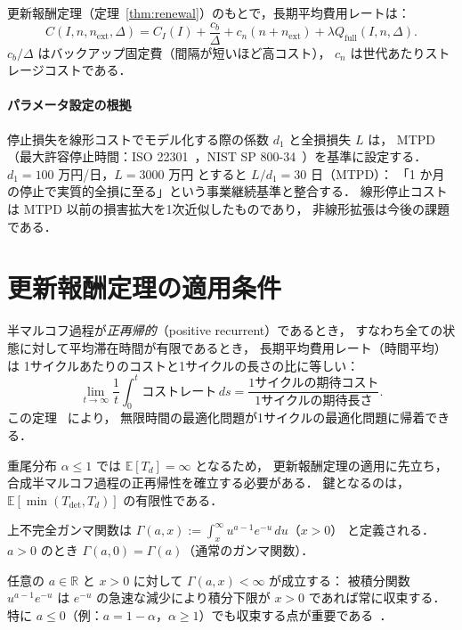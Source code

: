 \documentclass[12pt,a4paper]{article}
\theoremstyle{plain}
\theoremstyle{definition}
\theoremstyle{remark}
\newcommand{\E}{\mathbb{E}}
\newcommand{\Qf}{Q_{\mathrm{full}}}
\newcommand{\Tdet}{T_{\mathrm{det}}}
\begin{document}
更新報酬定理（定理~\ref{thm:renewal}）のもとで，長期平均費用レートは：
\begin{equation}\label{eq:cost_rate}
C(I,n,n_{\mathrm{ext}},\Delta)
= C_I(I)+\frac{c_b}{\Delta}+c_n(n+n_{\mathrm{ext}})+\lambda\Qf(I,n,\Delta).
\end{equation}
$c_b/\Delta$ はバックアップ固定費（間隔が短いほど高コスト），
$c_n$ は世代あたりストレージコストである．

\paragraph{パラメータ設定の根拠}
停止損失を線形コストでモデル化する際の係数 $d_1$ と全損損失 $L$ は，
MTPD（最大許容停止時間：ISO 22301~\cite{iso22301}，NIST SP 800-34~\cite{nist80034}）を基準に設定する．
$d_1=100$ 万円/日，$L=3000$ 万円 とすると $L/d_1=30$ 日（MTPD）：
「1 か月の停止で実質的全損に至る」という事業継続基準と整合する．
線形停止コストは MTPD 以前の損害拡大を1次近似したものであり，
非線形拡張は今後の課題である．

\section{更新報酬定理の適用条件}
\label{sec:renewal}

\begin{tcolorbox}[mathbox, title={更新報酬定理（Renewal Reward Theorem）}]
半マルコフ過程が\emph{正再帰的}（positive recurrent）であるとき，
すなわち全ての状態に対して平均滞在時間が有限であるとき，
長期平均費用レート（時間平均）は 1サイクルあたりのコストと1サイクルの長さの比に等しい：
\[
\lim_{t\to\infty}\frac{1}{t}\int_0^t \text{コストレート}\,ds
=\frac{\text{1サイクルの期待コスト}}{\text{1サイクルの期待長さ}}.
\]
この定理~\cite{ross2014,cox1962,karlin1975,asmussen2003} により，
無限時間の最適化問題が1サイクルの最適化問題に帰着できる．
\end{tcolorbox}

重尾分布 $\alpha\le1$ では $\E[T_d]=\infty$ となるため，
更新報酬定理の適用に先立ち，合成半マルコフ過程の正再帰性を確立する必要がある．
鍵となるのは，$\E[\min(\Tdet,T_d)]$ の有限性である．

\begin{tcolorbox}[keybox, title={上不完全ガンマ関数（Upper Incomplete Gamma Function）}]
上不完全ガンマ関数は
$\Gamma(a,x):=\int_x^\infty u^{a-1}e^{-u}\,du$（$x>0$）
と定義される．$a>0$ のとき $\Gamma(a,0)=\Gamma(a)$（通常のガンマ関数）．

任意の $a\in\mathbb{R}$ と $x>0$ に対して $\Gamma(a,x)<\infty$ が成立する：
被積分関数 $u^{a-1}e^{-u}$ は $e^{-u}$ の急速な減少により積分下限が $x>0$ であれば常に収束する．
特に $a\le0$（例：$a=1-\alpha$，$\alpha\ge1$）でも収束する点が重要である~\cite{abramowitz1965,nist_dlmf}．
\end{tcolorbox}
\end{document}
